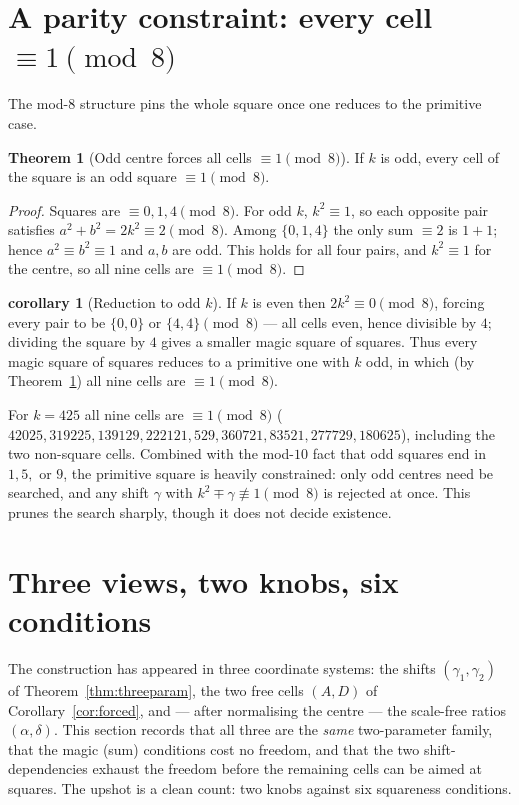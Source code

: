 \documentclass[11pt]{article}
\theoremstyle{definition}
\newtheorem{theorem}{Theorem}
\newtheorem{corollary}{corollary}
\begin{document}
\section{A parity constraint: every cell $\equiv 1\pmod 8$}

The mod-$8$ structure pins the whole square once one reduces to the primitive
case.

\begin{theorem}[Odd centre forces all cells $\equiv1\pmod 8$]\label{thm:mod8}
If $k$ is odd, every cell of the square is an odd square $\equiv1\pmod 8$.
\end{theorem}

\begin{proof}
Squares are $\equiv0,1,4\pmod8$. For odd $k$, $k^{2}\equiv1$, so each opposite
pair satisfies $a^{2}+b^{2}=2k^{2}\equiv2\pmod8$. Among $\{0,1,4\}$ the only sum
$\equiv2$ is $1+1$; hence $a^{2}\equiv b^{2}\equiv1$ and $a,b$ are odd. This holds
for all four pairs, and $k^{2}\equiv1$ for the centre, so all nine cells are
$\equiv1\pmod8$.
\end{proof}

\begin{corollary}[Reduction to odd $k$]\label{cor:oddk}
If $k$ is even then $2k^{2}\equiv0\pmod8$, forcing every pair to be
$\{0,0\}$ or $\{4,4\}\pmod8$ --- all cells even, hence divisible by $4$; dividing
the square by $4$ gives a smaller magic square of squares. Thus every magic square
of squares reduces to a primitive one with $k$ odd, in which (by
Theorem~\ref{thm:mod8}) all nine cells are $\equiv1\pmod8$.
\end{corollary}

\noindent For $k=425$ all nine cells are $\equiv1\pmod8$
($42025,319225,139129,222121,529,360721,83521,277729,180625$), including the two
non-square cells. Combined with the mod-$10$ fact that odd squares end in
$1,5,$ or $9$, the primitive square is heavily constrained: only odd centres need
be searched, and any shift $\gamma$ with $k^{2}\mp\gamma\not\equiv1\pmod8$ is
rejected at once. This prunes the search sharply, though it does not decide
existence.

\section{Three views, two knobs, six conditions}\label{sec:dof}

The construction has appeared in three coordinate systems: the shifts
$(\gamma_1,\gamma_2)$ of Theorem~\ref{thm:threeparam}, the two free cells
$(A,D)$ of Corollary~\ref{cor:forced}, and --- after normalising the centre ---
the scale-free ratios $(\alpha,\delta)$. This section records that all three are
the \emph{same} two-parameter family, that the magic (sum) conditions cost no
freedom, and that the two shift-dependencies exhaust the freedom before the
remaining cells can be aimed at squares. The upshot is a clean count: two knobs
against six squareness conditions.
\end{document}
